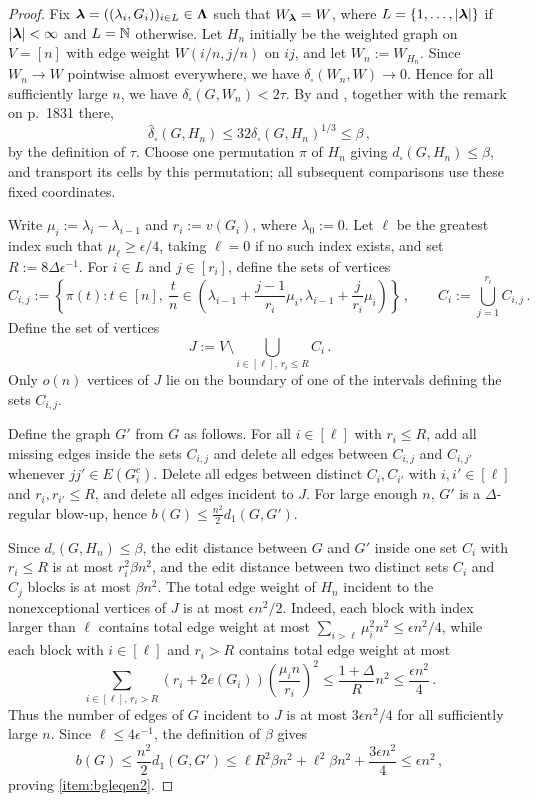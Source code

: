 \begin{proof}
Fix ${\boldsymbol{\lambda}}=((\lambda_i,G_i))_{i\in L}\in{\boldsymbol{\Lambda}}$ such that $W_{\boldsymbol{\lambda}}=W$, where $L=\{1,\dots,\lvert{\boldsymbol{\lambda}}\rvert\}$ if $\lvert{\boldsymbol{\lambda}}\rvert<\infty$ and $L={\mathbb N}$ otherwise. Let $H_n$ initially be the weighted graph on $V=[n]$ with edge weight $W(i/n,j/n)$ on $ij$, and let $W_n:=W_{H_n}$. Since $W_n\to W$ pointwise almost everywhere, we have $\delta_\square(W_n,W)\to0$. Hence for all sufficiently large $n$, we have $\delta_\square(G,W_n)<2\tau$. By \cite[Lemma~8.9]{lovasz2012large} and \cite[Theorem~2.3]{borgs2008convergent}, together with the remark on p.~1831 there,
$$\widehat\delta_\square(G,H_n)\leq32\delta_\square(G,H_n)^{1/3}\leq\beta\,,$$
by the definition of $\tau$. Choose one permutation $\pi$ of $H_n$ giving $d_\square(G,H_n)\leq\beta$, and transport its cells by this permutation; all subsequent comparisons use these fixed coordinates.

Write $\mu_i:=\lambda_i-\lambda_{i-1}$ and $r_i:=v(G_i)$, where $\lambda_0:=0$. Let $\ell$ be the greatest index such that $\mu_\ell\geq\epsilon/4$, taking $\ell=0$ if no such index exists, and set $R:=8\Delta\epsilon^{-1}$. For $i\in L$ and $j\in[r_i]$, define the sets of vertices
$$C_{i,j}:=\left\{\pi(t):t\in[n],\ \frac{t}{n}\in\left(\lambda_{i-1}+\frac{j-1}{r_i}\mu_i,\lambda_{i-1}+\frac{j}{r_i}\mu_i\right)\right\}\,,\qquad C_i:=\bigcup_{j=1}^{r_i}C_{i,j}\,.$$
Define the set of vertices
$$J:=V\setminus\bigcup_{i\in[\ell],\,r_i\leq R}C_i\,.$$
Only $o(n)$ vertices of $J$ lie on the boundary of one of the intervals defining the sets $C_{i,j}$.

Define the graph $G'$ from $G$ as follows. For all $i\in[\ell]$ with $r_i\leq R$, add all missing edges inside the sets $C_{i,j}$ and delete all edges between $C_{i,j}$ and $C_{i,j'}$ whenever $jj'\in E(G_i^c)$. Delete all edges between distinct $C_i,C_{i'}$ with $i,i'\in[\ell]$ and $r_i,r_{i'}\leq R$, and delete all edges incident to $J$. For large enough $n$, $G'$ is a $\Delta$-regular blow-up, hence $b(G)\leq \frac{n^2}{2}d_1(G,G')$.

Since $d_\square(G,H_n)\leq\beta$, the edit distance between $G$ and $G'$ inside one set $C_i$ with $r_i\leq R$ is at most $r_i^2\beta n^2$, and the edit distance between two distinct sets $C_i$ and $C_j$ blocks is at most $\beta n^2$. The total edge weight of $H_n$ incident to the nonexceptional vertices of $J$ is at most $\epsilon n^2/2$. Indeed, each block with index larger than $\ell$ contains total edge weight at most $\sum_{i>\ell}\mu_i^2n^2\leq\epsilon n^2/4$, while each block with $i\in[\ell]$ and $r_i>R$ contains total edge weight at most
$$\sum_{i\in[\ell],\,r_i>R}\left(r_i+2e(G_i)\right)\left(\frac{\mu_i n}{r_i}\right)^2\leq\frac{1+\Delta}{R}n^2\leq\frac{\epsilon n^2}{4}\,.$$
Thus the number of edges of $G$ incident to $J$ is at most $3\epsilon n^2/4$ for all sufficiently large $n$. Since $\ell\leq4\epsilon^{-1}$, the definition of $\beta$ gives
$$b(G)\leq \frac{n^2}{2}d_1(G,G')\leq\ell R^2\beta n^2+\ell^2\beta n^2+\frac{3\epsilon n^2}{4}\leq\epsilon n^2\,,$$
proving \ref{item:bgleqen2}.


\end{proof}
